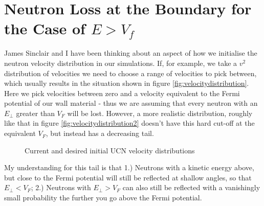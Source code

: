 \documentclass[11pt,a4paper,oneside]{article}
\begin{document}
\section*{Neutron Loss at the Boundary for the Case of $E > V_{f}$}

James Sinclair and I have been thinking about an aspect of how we initialise the neutron velocity distribution in our simulations. If, for example, we take a $v^{2}$ distribution of velocities we need to choose a range of velocities to pick between, which usually results in the situation shown in figure \ref{fig:velocitydistribution}. Here we pick velocities between zero and a velocity equivalent to the Fermi potential of our wall material - thus we are assuming that every neutron with an $E_{\perp}$ greater than $V_{F}$ will be lost. However, a more realistic distribution, roughly like that in figure \ref{fig:velocitydistribution2} doesn't have this hard cut-off at the equivalent $V_{F}$, but instead has a decreasing tail. 

\begin{figure}[!htbp] 
\centering 
{} \hspace{2mm} 
 \hspace{2mm}
\caption{Current and desired initial UCN velocity distributions} 
\label{fig:distributions} 
\end{figure}

My understanding for this tail is that 1.) Neutrons with a kinetic energy above, but close to the Fermi potential will still be reflected at shallow angles, so that $E_{\perp} < V_{F}$; 2.) Neutrons with $E_{\perp} > V_{F}$ can also still be reflected with a vanishingly small probability the further you go above the Fermi potential. 
\end{document}
